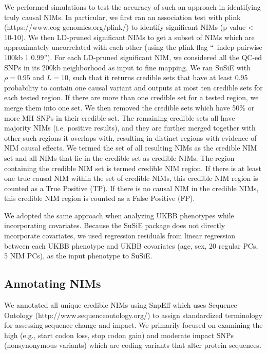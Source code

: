 We performed simulations to test the accuracy of such an approach in identifying truly causal NIMs. In particular, we first ran an association test with plink (https://www.cog-genomics.org/plink/) to identify significant NIMs (p-value < 10-10). We then LD-pruned significant NIMs to get a subset of NIMs which are approximately uncorrelated with each other (using the plink flag ``--indep-pairwise 100kb 1 0.99''). For each LD-pruned significant NIM, we considered all the QC-ed SNPs in its 200kb neighborhood as input to fine mapping. We ran SuSiE with $\rho = 0.95$ and $L = 10$, such that it returns credible sets that have at least 0.95 probability to contain one causal variant and outputs at most ten credible sets for each tested region. If there are more than one credible set for a tested region, we merge them into one set.     We then removed the credible sets which have 50\% or more MH SNPs in their credible set. The remaining credible sets all have majority NIMs (i.e. positive results), and they are further merged together with other such regions it overlaps with, resulting in distinct regions with evidence of NIM causal effects. We termed the set of all resulting NIMs as the credible NIM set and all NIMs that lie in the credible set as credible NIMs. The region containing the credible NIM set is termed credible NIM region. If there is at least one true causal NIM within the set of credible NIMs, this credible NIM region is counted as a True Positive (TP). If there is no causal NIM in the credible NIMs, this credible NIM region is counted as a False Positive (FP). 
 
We adopted the same approach when analyzing UKBB phenotypes while incorporating covariates. Because the SuSiE package does not directly incorporate covariates, we used regression residuals from linear regression between each UKBB phenotype and UKBB covariates (age, sex, 20 regular PCs, 5 NIM PCs), as the input phenotype to SuSiE.   

\subsection{Annotating NIMs}
We annotated all unique credible NIMs using SnpEff \cite{cingolani2012program} which uses Sequence Ontology (http://www.sequenceontology.org/) to assign standardized terminology for assessing sequence change and impact. We primarily focused on examining the high (e.g., start codon loss, stop codon gain) and moderate impact SNPs (nonsynonymous variants) which are coding variants that alter protein sequences.

